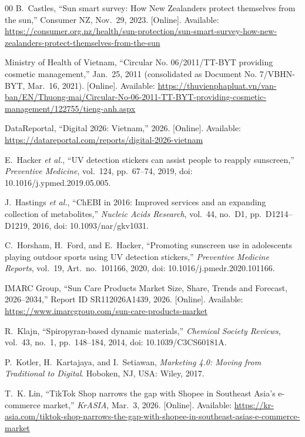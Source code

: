 \documentclass[12pt,a4paper]{article}
\numberwithin{table}{section}    %
\numberwithin{figure}{section}   %
\begin{document}
\begin{thebibliography}{00}
B.~Castles, ``Sun smart survey: How New Zealanders protect themselves from the sun,'' Consumer NZ,
Nov.~29, 2023. [Online]. Available:
\url{https://consumer.org.nz/health/sun-protection/sun-smart-survey-how-new-zealanders-protect-themselves-from-the-sun}

Ministry of Health of Vietnam, ``Circular No. 06/2011/TT-BYT providing cosmetic management,'' Jan.~25, 2011
(consolidated as Document No. 7/VBHN-BYT, Mar.~16, 2021). [Online]. Available:
\url{https://thuvienphapluat.vn/van-ban/EN/Thuong-mai/Circular-No-06-2011-TT-BYT-providing-cosmetic-management/122755/tieng-anh.aspx}

DataReportal, ``Digital 2026: Vietnam,'' 2026. [Online]. Available:
\url{https://datareportal.com/reports/digital-2026-vietnam}

E.~Hacker \emph{et al.}, ``UV detection stickers can assist people to reapply sunscreen,''
\emph{Preventive Medicine}, vol.~124, pp.~67--74, 2019, doi: 10.1016/j.ypmed.2019.05.005.

J.~Hastings \emph{et al.}, ``ChEBI in 2016: Improved services and an expanding collection of metabolites,''
\emph{Nucleic Acids Research}, vol.~44, no.~D1, pp.~D1214--D1219, 2016, doi: 10.1093/nar/gkv1031.

C.~Horsham, H.~Ford, and E.~Hacker, ``Promoting sunscreen use in adolescents playing outdoor sports using UV
detection stickers,'' \emph{Preventive Medicine Reports}, vol.~19, Art.~no.~101166, 2020,
doi: 10.1016/j.pmedr.2020.101166.

IMARC Group, ``Sun Care Products Market Size, Share, Trends and Forecast, 2026--2034,''
Report ID SR112026A1439, 2026. [Online]. Available:
\url{https://www.imarcgroup.com/sun-care-products-market}

R.~Klajn, ``Spiropyran-based dynamic materials,'' \emph{Chemical Society Reviews}, vol.~43, no.~1,
pp.~148--184, 2014, doi: 10.1039/C3CS60181A.

P.~Kotler, H.~Kartajaya, and I.~Setiawan, \emph{Marketing 4.0: Moving from Traditional to Digital}.
Hoboken, NJ, USA: Wiley, 2017.

T.~K. Lin, ``TikTok Shop narrows the gap with Shopee in Southeast Asia's e-commerce market,'' \emph{KrASIA},
Mar.~3, 2026. [Online]. Available:
\url{https://kr-asia.com/tiktok-shop-narrows-the-gap-with-shopee-in-southeast-asias-e-commerce-market}


\end{thebibliography}
\end{document}
